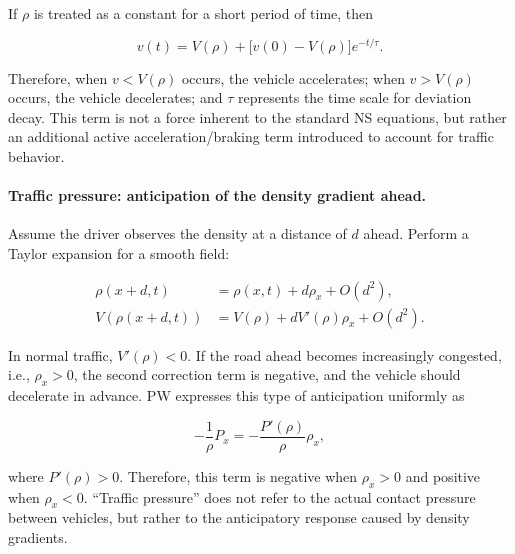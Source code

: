 \documentclass[11pt,a4paper,openany]{book}
\numberwithin{equation}{chapter}
\numberwithin{figure}{chapter}
\numberwithin{table}{chapter}
\begin{document}
If $\rho$ is treated as a constant for a short period of time, then

\begin{equation}
v(t)=V(\rho)+\bigl[v(0)-V(\rho)\bigr]e^{-t/\tau}.
\end{equation}

Therefore, when $v<V(\rho)$ occurs, the vehicle accelerates; when $v>V(\rho)$ occurs, the vehicle decelerates; and $\tau$ represents the time scale for deviation decay. This term is not a force inherent to the standard NS equations, but rather an additional active acceleration/braking term introduced to account for traffic behavior.










\paragraph{Traffic pressure: anticipation of the density gradient ahead.}







Assume the driver observes the density at a distance of $d$ ahead. Perform a Taylor expansion for a smooth field:

\begin{align}
\rho(x+d,t)
&=\rho(x,t)+d\rho_x+O(d^2),\\
V\!\left(\rho(x+d,t)\right)
&=V(\rho)+dV'(\rho)\rho_x+O(d^2).
\end{align}

In normal traffic, $V'(\rho)<0$. If the road ahead becomes increasingly congested, i.e., $\rho_x>0$, the second correction term is negative, and the vehicle should decelerate in advance. PW expresses this type of anticipation uniformly as

\begin{equation}
-\frac{1}{\rho}P_x
=-\frac{P'(\rho)}{\rho}\rho_x,
\label{eq:pw-pressure-chain}
\end{equation}

where $P'(\rho)>0$. Therefore, this term is negative when $\rho_x>0$ and positive when $\rho_x<0$. “Traffic pressure” does not refer to the actual contact pressure between vehicles, but rather to the anticipatory response caused by density gradients.
\end{document}
